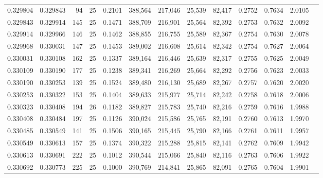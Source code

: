 \begin{tabular}{rrrrrrrrrrrrr}
0.329804 & 0.329843 &    94 &  25 &                                     0.2101 & 388,564 & 217,046 &  25,539 &  82,417 & 0.2752 & 0.7634 & 2.0105 \\
0.329843 & 0.329914 &   145 &  25 &                                     0.1471 & 388,709 & 216,901 &  25,564 &  82,392 & 0.2753 & 0.7632 & 2.0092 \\
0.329914 & 0.329966 &   146 &  25 &                                     0.1462 & 388,855 & 216,755 &  25,589 &  82,367 & 0.2754 & 0.7630 & 2.0078 \\
0.329968 & 0.330031 &   147 &  25 &                                     0.1453 & 389,002 & 216,608 &  25,614 &  82,342 & 0.2754 & 0.7627 & 2.0064 \\
0.330031 & 0.330108 &   162 &  25 &                                     0.1337 & 389,164 & 216,446 &  25,639 &  82,317 & 0.2755 & 0.7625 & 2.0049 \\
0.330109 & 0.330190 &   177 &  25 &                                     0.1238 & 389,341 & 216,269 &  25,664 &  82,292 & 0.2756 & 0.7623 & 2.0033 \\
0.330190 & 0.330253 &   139 &  25 &                                     0.1524 & 389,480 & 216,130 &  25,689 &  82,267 & 0.2757 & 0.7620 & 2.0020 \\
0.330253 & 0.330322 &   153 &  25 &                                     0.1404 & 389,633 & 215,977 &  25,714 &  82,242 & 0.2758 & 0.7618 & 2.0006 \\
0.330323 & 0.330408 &   194 &  26 &                                     0.1182 & 389,827 & 215,783 &  25,740 &  82,216 & 0.2759 & 0.7616 & 1.9988 \\
0.330408 & 0.330484 &   197 &  25 &                                     0.1126 & 390,024 & 215,586 &  25,765 &  82,191 & 0.2760 & 0.7613 & 1.9970 \\
0.330485 & 0.330549 &   141 &  25 &                                     0.1506 & 390,165 & 215,445 &  25,790 &  82,166 & 0.2761 & 0.7611 & 1.9957 \\
0.330549 & 0.330613 &   157 &  25 &                                     0.1374 & 390,322 & 215,288 &  25,815 &  82,141 & 0.2762 & 0.7609 & 1.9942 \\
0.330613 & 0.330691 &   222 &  25 &                                     0.1012 & 390,544 & 215,066 &  25,840 &  82,116 & 0.2763 & 0.7606 & 1.9922 \\
0.330692 & 0.330773 &   225 &  25 &                                     0.1000 & 390,769 & 214,841 &  25,865 &  82,091 & 0.2765 & 0.7604 & 1.9901 \\

\end{tabular}
